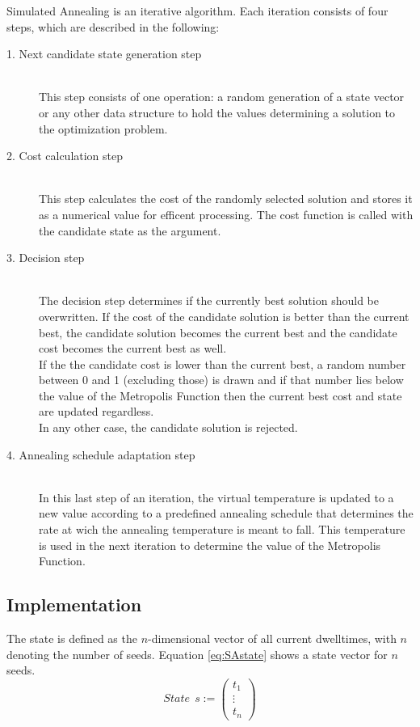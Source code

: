 \documentclass[12pt]{article}
\begin{document}
Simulated Annealing is an iterative algorithm. Each iteration consists of four steps, which are described in the following:                                                           

\begin{description}
\item[1. Next candidate state generation step]~\\
This step consists of one operation: a random generation of a state vector or any other data structure to hold the values determining a solution to the optimization problem.
\item[2. Cost calculation step]~\\
This step calculates the cost of the randomly selected solution and stores it as a numerical value for efficent processing. The cost function is called with the candidate state as the argument.
\item[3. Decision step]~\\
The decision step determines if the currently best solution should be overwritten. If the cost of the candidate solution is better than the current best, the candidate solution becomes the current best and the candidate cost becomes the current best as well. \\ If the the candidate cost is lower than the current best, a random number between 0 and 1 (excluding those) is drawn and if that number lies below the value of the Metropolis Function then the current best cost and state are updated regardless. \\ In any other case, the candidate solution is rejected. 
\item[4. Annealing schedule adaptation step]~\\
In this last step of an iteration, the virtual temperature is updated to a new value according to a predefined annealing schedule that determines the rate at wich the annealing temperature is meant to fall. This temperature is used in the next iteration to determine the value of the Metropolis Function.
\end{description} 

\subsection{Implementation}
\label{subsec:impl}
The state is defined as the $n$-dimensional vector of all current dwelltimes, with $n$ denoting the number of seeds. Equation \eqref{eq:SAstate} shows a state vector for $n$ seeds.
 \begin{equation}
 \label{eq:SAstate}
 State \ \ s := \begin{pmatrix}
 t_{1} \\ \vdots \\ t_{n} 	
\end{pmatrix}   
\end{equation} 
 
\end{document}
